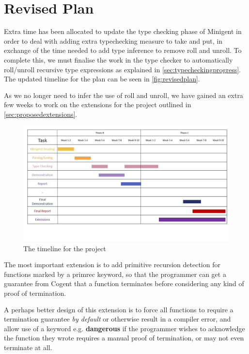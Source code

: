 \chapter{Revised Plan}
\label{ch:plan}

Extra time has been allocated to update the type checking phase of Minigent in order to deal with
adding extra typechecking measure to \textsf{take} and \textsf{put}, in exchange of the time
needed to add type inference to remove \textsf{roll} and \textsf{unroll}. To complete this,
we must finalise the work in the type checker to automatically \textsf{roll}/\textsf{unroll} recursive type expressions
as explained in \autoref{sec:typecheckingprogress}. The updated timeline for the plan can be seen in \autoref{fig:revisedplan}.

As we no longer need to infer the use of \textsf{roll} and \textsf{unroll}, we have gained an extra
few weeks to work on the extensions for the project outlined in \autoref{sec:proposedextensions}.

\begin{figure}
    \centering
    \includegraphics[height=0.50\textheight, angle=90]{content/revised_plan.jpg}
    \caption{The timeline for the project}
    \label{fig:revisedplan}
\end{figure}

The most important extension is to add primitive recursion detection for functions marked by
a \textsf{primrec} keyword, so that the programmer can get a guarantee from Cogent that
a function terminates before considering any kind of proof of termination.

A perhaps better design of this extension is to force all functions to require a termination guarantee
\textit{by default} or otherwise result in a compiler error, and allow use of a keyword e.g. \textbf{dangerous}
if the programmer wishes to acknowledge the function they wrote requires a manual proof of termination, or
may not even terminate at all.

